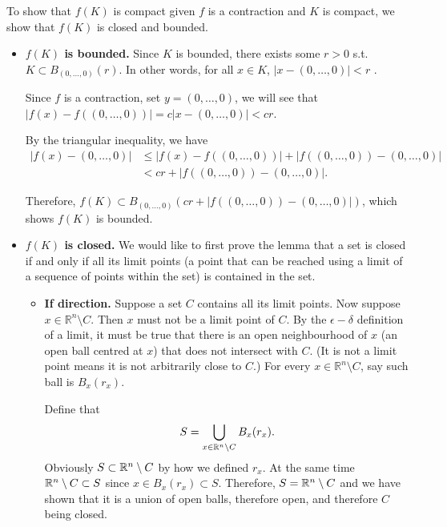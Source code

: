 To show that \(f(K)\) is compact given \(f\) is a contraction and \(K\) is compact, we show that \(f(K)\) is closed and bounded.

\begin{itemize}
    \item \textbf{\(f(K)\) is bounded.} Since \(K\) is bounded, there exists some \(r > 0\) s.t. \(K \subset B_{(0, \ldots, 0)} (r)\). In other words, for all \(x \in K\), \(|x - (0, \ldots, 0)| < r\) .
        
    Since \(f\) is a contraction, set \(y = (0, \ldots, 0)\), we will see that \(|f(x) - f((0, \ldots, 0))| = c|x - (0, \ldots, 0)| < cr\).
    
    By the triangular inequality, we have
    \begin{align*}
        |f(x) - (0, \ldots, 0)| &\leq |f(x) - f((0, \ldots, 0))| + |f((0, \ldots, 0)) - (0, \ldots, 0)|\\
        &< cr + |f((0, \ldots, 0)) - (0, \ldots, 0)|.
    \end{align*}
    
    Therefore, \(f(K) \subset B_{(0, \ldots, 0)} (cr + |f((0, \ldots, 0)) - (0, \ldots, 0)|)\), which shows \(f(K)\) is bounded.
        
    \item \textbf{\(f(K)\) is closed.} We would like to first prove the lemma that a set is closed if and only if all its limit points (a point that can be reached using a limit of a sequence of points within the set) is contained in the set.
    \begin{itemize}
        \item \textbf{If direction.} Suppose a set \(C\) contains all its limit points. Now suppose \(x \in \mathbb{R}^n \setminus C\). Then \(x\) must not be a limit point of \(C\). By the \(\epsilon-\delta\) definition of a limit, it must be true that there is an open neighbourhood of \(x\) (an open ball centred at \(x\)) that does not intersect with \(C\). (It is not a limit point means it is not arbitrarily close to \(C\).) For every \(x \in \mathbb{R}^n \setminus C\), say such ball is \(B_x(r_x)\).

        Define that
        \[
            S = \bigcup_{x \in \mathbb{R}^n \setminus C} B_x (r_x).
        \]
        Obviously \(S \subset \mathbb{R}^n \setminus C\) by how we defined \(r_x\). At the same time \(\mathbb{R}^n\setminus C \subset S\) since \(x \in B_x(r_x) \subset S\). Therefore, \(S = \mathbb{R}^n \setminus C\) and we have shown that it is a union of open balls, therefore open, and therefore \(C\) being closed.
        

\end{itemize}
\end{itemize}
